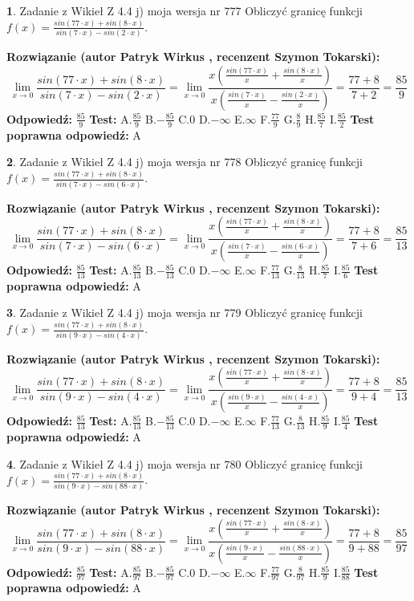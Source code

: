 \documentclass[12pt, a4paper]{article}
\theoremstyle{definition} %
\newtheorem{zad}{}
\newcommand{\zadStart}[1]{\begin{zad}#1\newline}
\newcommand{\zadStop}{\end{zad}}
\newcommand{\rozwStart}[2]{\noindent \textbf{Rozwiązanie (autor #1 , recenzent #2): }\newline}
\newcommand{\rozwStop}{\newline}
\newcommand{\odpStart}{\noindent \textbf{Odpowiedź:}\newline}
\newcommand{\odpStop}{\newline}
\newcommand{\testStart}{\noindent \textbf{Test:}\newline}
\newcommand{\testStop}{\newline}
\newcommand{\kluczStart}{\noindent \textbf{Test poprawna odpowiedź:}\newline}
\newcommand{\kluczStop}{\newline}
\begin{document}
\zadStart{Zadanie z Wikieł Z 4.4 j) moja wersja nr 777}
Obliczyć granicę funkcji $f(x)=\frac{sin(77\cdot x) +sin(8\cdot x)}{sin(7\cdot x) -sin(2\cdot x)}$.
\zadStop
\rozwStart{Patryk Wirkus}{Szymon Tokarski}
$$\lim\limits_{x\to 0}\frac{sin(77\cdot x) +sin(8\cdot x)}{sin(7\cdot x) -sin(2\cdot x)}=\lim\limits_{x\to 0}\frac{x(\frac{sin(77\cdot x)}{x}+\frac{sin(8\cdot x)}{x})}{x(\frac{sin(7\cdot x)}{x}-\frac{sin(2\cdot x)}{x})}=\frac{77+8}{7+2} = \frac{85}{9}$$
\rozwStop
\odpStart
$\frac{85}{9}$
\odpStop
\testStart
A.$\frac{85}{9}$
B.$-\frac{85}{9}$
C.$0$
D.$-\infty$
E.$\infty$
F.$\frac{77}{9}$
G.$\frac{8}{9}$
H.$\frac{85}{7}$
I.$\frac{85}{2}$
\testStop
\kluczStart
A
\kluczStop



\zadStart{Zadanie z Wikieł Z 4.4 j) moja wersja nr 778}
Obliczyć granicę funkcji $f(x)=\frac{sin(77\cdot x) +sin(8\cdot x)}{sin(7\cdot x) -sin(6\cdot x)}$.
\zadStop
\rozwStart{Patryk Wirkus}{Szymon Tokarski}
$$\lim\limits_{x\to 0}\frac{sin(77\cdot x) +sin(8\cdot x)}{sin(7\cdot x) -sin(6\cdot x)}=\lim\limits_{x\to 0}\frac{x(\frac{sin(77\cdot x)}{x}+\frac{sin(8\cdot x)}{x})}{x(\frac{sin(7\cdot x)}{x}-\frac{sin(6\cdot x)}{x})}=\frac{77+8}{7+6} = \frac{85}{13}$$
\rozwStop
\odpStart
$\frac{85}{13}$
\odpStop
\testStart
A.$\frac{85}{13}$
B.$-\frac{85}{13}$
C.$0$
D.$-\infty$
E.$\infty$
F.$\frac{77}{13}$
G.$\frac{8}{13}$
H.$\frac{85}{7}$
I.$\frac{85}{6}$
\testStop
\kluczStart
A
\kluczStop



\zadStart{Zadanie z Wikieł Z 4.4 j) moja wersja nr 779}
Obliczyć granicę funkcji $f(x)=\frac{sin(77\cdot x) +sin(8\cdot x)}{sin(9\cdot x) -sin(4\cdot x)}$.
\zadStop
\rozwStart{Patryk Wirkus}{Szymon Tokarski}
$$\lim\limits_{x\to 0}\frac{sin(77\cdot x) +sin(8\cdot x)}{sin(9\cdot x) -sin(4\cdot x)}=\lim\limits_{x\to 0}\frac{x(\frac{sin(77\cdot x)}{x}+\frac{sin(8\cdot x)}{x})}{x(\frac{sin(9\cdot x)}{x}-\frac{sin(4\cdot x)}{x})}=\frac{77+8}{9+4} = \frac{85}{13}$$
\rozwStop
\odpStart
$\frac{85}{13}$
\odpStop
\testStart
A.$\frac{85}{13}$
B.$-\frac{85}{13}$
C.$0$
D.$-\infty$
E.$\infty$
F.$\frac{77}{13}$
G.$\frac{8}{13}$
H.$\frac{85}{9}$
I.$\frac{85}{4}$
\testStop
\kluczStart
A
\kluczStop



\zadStart{Zadanie z Wikieł Z 4.4 j) moja wersja nr 780}
Obliczyć granicę funkcji $f(x)=\frac{sin(77\cdot x) +sin(8\cdot x)}{sin(9\cdot x) -sin(88\cdot x)}$.
\zadStop
\rozwStart{Patryk Wirkus}{Szymon Tokarski}
$$\lim\limits_{x\to 0}\frac{sin(77\cdot x) +sin(8\cdot x)}{sin(9\cdot x) -sin(88\cdot x)}=\lim\limits_{x\to 0}\frac{x(\frac{sin(77\cdot x)}{x}+\frac{sin(8\cdot x)}{x})}{x(\frac{sin(9\cdot x)}{x}-\frac{sin(88\cdot x)}{x})}=\frac{77+8}{9+88} = \frac{85}{97}$$
\rozwStop
\odpStart
$\frac{85}{97}$
\odpStop
\testStart
A.$\frac{85}{97}$
B.$-\frac{85}{97}$
C.$0$
D.$-\infty$
E.$\infty$
F.$\frac{77}{97}$
G.$\frac{8}{97}$
H.$\frac{85}{9}$
I.$\frac{85}{88}$
\testStop
\kluczStart
A
\kluczStop
\end{document}
